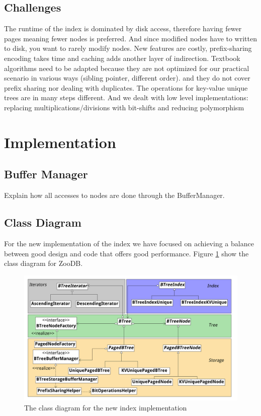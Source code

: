 \documentclass[11pt,a4paper,oneside]{article}
\begin{document}
\subsection{Challenges}

 The runtime of the index is dominated by disk access, therefore having fewer pages meaning fewer nodes is preferred.
 And since modified nodes have to written to disk, you want to rarely modify nodes.
 New features are costly, prefix-sharing encoding takes time and caching adds another layer of indirection.
 Textbook algorithms need to be adapted because they are not optimized for our practical scenario in various ways (sibling pointer, different order).
 and they do not cover prefix sharing nor dealing with duplicates. The operations for key-value unique trees are in many steps different.
 And we dealt with low level implementations: replacing multiplications/divisions with bit-shifts and reducing polymorphism

\section{Implementation}
\subsection{Buffer Manager} %
\label{sub:buffer_manager}
Explain how all accesses to nodes are done through the BufferManager.

\subsection{Class Diagram} %
\label{sub:class_diagram}

For the new implementation of the index we have focused on achieving a balance between good design and code that offers good performance. Figure \ref{fig:class-diagram} show the class diagram for ZooDB.  
\begin{figure}[h]
\includegraphics[scale=0.089, center]{ZooDBClassDiagram} 
\caption{The class diagram for the new index implementation}
\label{fig:class-diagram}
\end{figure}
\end{document}

